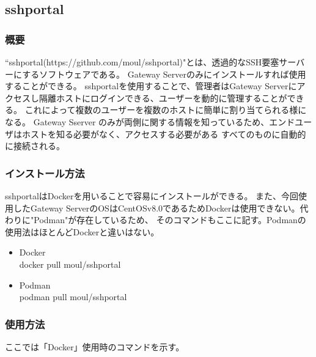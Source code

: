 \documentclass[12pt,a4paper,titlepage]{jsarticle}
\begin{document}

\subsection{sshportal}

\subsubsection*{概要}
``sshportal(https://github.com/moul/sshportal)"とは、透過的なSSH要塞サーバーにするソフトウェアである。
Gateway Serverのみにインストールすれば使用することができる。
sshportalを使用することで、管理者はGateway Serverにアクセスし隔離ホストにログインできる、ユーザーを動的に管理することができる。
これによって複数のユーザーを複数のホストに簡単に割り当てられる様になる。
Gateway Sserver のみが両側に関する情報を知っているため、エンドユーザはホストを知る必要がなく、アクセスする必要がある
すべてのものに自動的に接続される。


\subsubsection*{インストール方法}
sshportalはDockerを用いることで容易にインストールができる。
また、今回使用したGateway ServerのOSはCentOSv8.0であるためDockerは使用できない。代わりに"Podman"が存在しているため、
そのコマンドもここに記す。Podmanの使用法はほとんどDockerと違いはない。

\begin{itemize}
    \item Docker\mbox{}\\docker pull moul/sshportal
    \item Podman\mbox{}\\podman pull moul/sshportal
\end{itemize}

\subsubsection*{使用方法}
ここでは「Docker」使用時のコマンドを示す。
\end{document}
